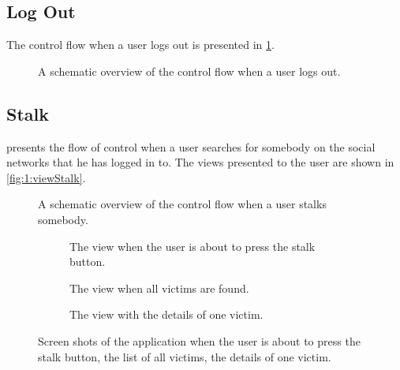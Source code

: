 	\subsection{Log Out}	
			The control flow when a user logs out is presented in \cref{fig:1:controlflowLogOut}. 

			\begin{figure}
				\caption{A schematic overview of the control flow when a user logs out.}
				\label{fig:1:controlflowLogOut}
			\end{figure}		

	\subsection{Stalk}
		 presents the flow of control when a user searches for somebody on the social networks that he has logged in to. The views presented to the user are shown in \autoref{fig:1:viewStalk}.


			\begin{figure}
				\caption{A schematic overview of the control flow when a user stalks somebody.}
				\label{fig:1:controlflowStalk}
			\end{figure}	

			\begin{figure}
				\begin{subfigure}{\textwidth}
					\caption{The view when the user is about to press the stalk button.}
					\label{fig:1:viewStalk:startStalk}
				\end{subfigure}
				\begin{subfigure}{\textwidth}
					\caption{The view when all victims are found.}
					\label{fig:1:viewStalk:allVictims}
				\end{subfigure}		
				\begin{subfigure}{\textwidth}
					\caption{The view with the details of one victim.}
					\label{fig:1:viewStalk:oneVictim}
				\end{subfigure}						
				
				\caption{Screen shots of the application when  the user is about to press the stalk button,  the list of all victims,  the details of one victim.}
				\label{fig:1:viewStalk}
			\end{figure}

